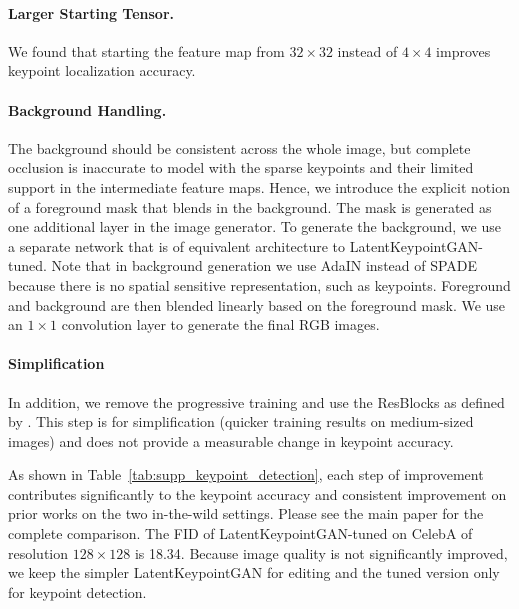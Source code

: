 \documentclass[10pt, conference, compsocconf]{IEEEtran}
\begin{document}
\paragraph{Larger Starting Tensor.} We found that starting the feature map from $32\times32$ instead of $4\times4$ improves keypoint localization accuracy. 


\paragraph{Background Handling.} The background should be consistent across the whole image, but complete occlusion is inaccurate to model with the sparse keypoints and their limited support in the intermediate feature maps. Hence, we introduce the explicit notion of a foreground mask that blends in the background. The mask is generated as one additional layer in the image generator. To generate the background, we use a separate network that is of equivalent architecture to LatentKeypointGAN-tuned. Note that in background generation we use AdaIN \cite{huang2017arbitrary} instead of SPADE because there is no spatial sensitive representation, such as keypoints. Foreground and background are then blended linearly based on the foreground mask. We use an $1\times1$ convolution layer to generate the final RGB images.

\paragraph{Simplification} In addition, we remove the progressive training \cite{karras2018progressive} and use the ResBlocks as defined by \cite{park2019semantic}. This step is for simplification (quicker training results on medium-sized images) and does not provide a measurable change in keypoint accuracy.

As shown in Table~\ref{tab:supp_keypoint_detection}, each step of improvement contributes significantly to the keypoint accuracy and consistent improvement on prior works on the two in-the-wild settings. Please see the main paper for the complete comparison. The FID of LatentKeypointGAN-tuned on CelebA of resolution $128\times 128$ is 18.34. Because image quality is not significantly improved, we keep the simpler LatentKeypointGAN for editing and the tuned version only for keypoint detection.
\end{document}
